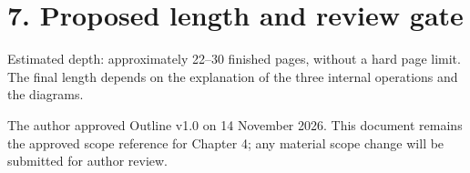 \section*{7. Proposed length and review gate}
Estimated depth: approximately 22--30 finished pages, without a hard page limit. The final length depends on the explanation of the three internal operations and the diagrams.

\begin{takeawaybox}
The author approved Outline v1.0 on 14 November 2026. This document remains the approved scope reference for Chapter 4; any material scope change will be submitted for author review.
\end{takeawaybox}


